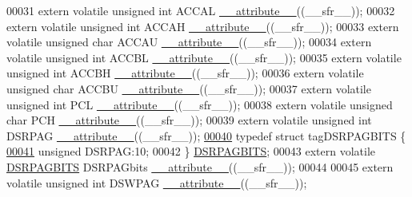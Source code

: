 \begin{DoxyCode}
00031 \textcolor{keyword}{extern} \textcolor{keyword}{volatile} \textcolor{keywordtype}{unsigned} \textcolor{keywordtype}{int}  ACCAL \hyperlink{a00015_a493c46f03454991ccc5aa7a6e1dfb2a7}{\_\_attribute\_\_}((\_\_sfr\_\_));
00032 \textcolor{keyword}{extern} \textcolor{keyword}{volatile} \textcolor{keywordtype}{unsigned} \textcolor{keywordtype}{int}  ACCAH \hyperlink{a00015_a493c46f03454991ccc5aa7a6e1dfb2a7}{\_\_attribute\_\_}((\_\_sfr\_\_));
00033 \textcolor{keyword}{extern} \textcolor{keyword}{volatile} \textcolor{keywordtype}{unsigned} \textcolor{keywordtype}{char} ACCAU \hyperlink{a00015_a493c46f03454991ccc5aa7a6e1dfb2a7}{\_\_attribute\_\_}((\_\_sfr\_\_));
00034 \textcolor{keyword}{extern} \textcolor{keyword}{volatile} \textcolor{keywordtype}{unsigned} \textcolor{keywordtype}{int}  ACCBL \hyperlink{a00015_a493c46f03454991ccc5aa7a6e1dfb2a7}{\_\_attribute\_\_}((\_\_sfr\_\_));
00035 \textcolor{keyword}{extern} \textcolor{keyword}{volatile} \textcolor{keywordtype}{unsigned} \textcolor{keywordtype}{int}  ACCBH \hyperlink{a00015_a493c46f03454991ccc5aa7a6e1dfb2a7}{\_\_attribute\_\_}((\_\_sfr\_\_));
00036 \textcolor{keyword}{extern} \textcolor{keyword}{volatile} \textcolor{keywordtype}{unsigned} \textcolor{keywordtype}{char} ACCBU \hyperlink{a00015_a493c46f03454991ccc5aa7a6e1dfb2a7}{\_\_attribute\_\_}((\_\_sfr\_\_));
00037 \textcolor{keyword}{extern} \textcolor{keyword}{volatile} \textcolor{keywordtype}{unsigned} \textcolor{keywordtype}{int}  PCL \hyperlink{a00015_a493c46f03454991ccc5aa7a6e1dfb2a7}{\_\_attribute\_\_}((\_\_sfr\_\_));
00038 \textcolor{keyword}{extern} \textcolor{keyword}{volatile} \textcolor{keywordtype}{unsigned} \textcolor{keywordtype}{char} PCH \hyperlink{a00015_a493c46f03454991ccc5aa7a6e1dfb2a7}{\_\_attribute\_\_}((\_\_sfr\_\_));
00039 \textcolor{keyword}{extern} \textcolor{keyword}{volatile} \textcolor{keywordtype}{unsigned} \textcolor{keywordtype}{int}  DSRPAG \hyperlink{a00015_a493c46f03454991ccc5aa7a6e1dfb2a7}{\_\_attribute\_\_}((\_\_sfr\_\_));
\hypertarget{a00015_source_l00040}{}\hyperlink{a00014}{00040} \textcolor{keyword}{typedef} \textcolor{keyword}{struct }tagDSRPAGBITS \{
\hypertarget{a00015_source_l00041}{}\hyperlink{a00014_aff447cf33b47980fe8688cfbbc9ad6e2}{00041}   \textcolor{keywordtype}{unsigned} DSRPAG:10;
00042 \} \hyperlink{a00014_d9/d3a/a00439}{DSRPAGBITS};
00043 \textcolor{keyword}{extern} \textcolor{keyword}{volatile} \hyperlink{a00014_d9/d3a/a00439}{DSRPAGBITS} DSRPAGbits \hyperlink{a00015_a493c46f03454991ccc5aa7a6e1dfb2a7}{\_\_attribute\_\_}((\_\_sfr\_\_));
00044 
00045 \textcolor{keyword}{extern} \textcolor{keyword}{volatile} \textcolor{keywordtype}{unsigned} \textcolor{keywordtype}{int}  DSWPAG \hyperlink{a00015_a493c46f03454991ccc5aa7a6e1dfb2a7}{\_\_attribute\_\_}((\_\_sfr\_\_));

\end{DoxyCode}
